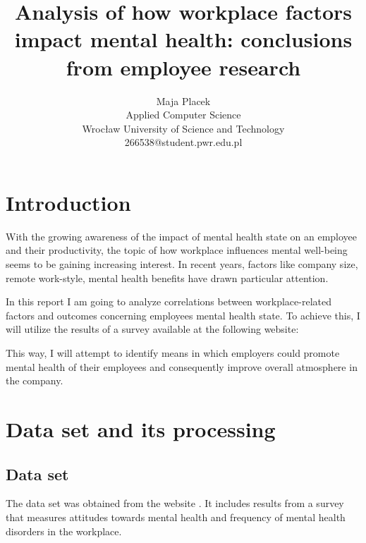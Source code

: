 \documentclass[conference]{IEEEtran}
\title{Analysis of how workplace factors impact mental health: conclusions from employee research}
\author{Maja Placek\\
Applied Computer Science\\
Wrocław University of Science and Technology\\
266538@student.pwr.edu.pl }
\begin{document}
\maketitle

\section{Introduction}
With the growing awareness of the impact of mental health state on an employee and their productivity, the topic of how workplace influences mental well-being seems to be gaining increasing interest. In recent years, factors like company size, remote work-style, mental health benefits have drawn particular attention. 

In this report I am going to analyze correlations between workplace-related factors and outcomes concerning employees mental health state. To achieve this, I will utilize the results of a survey available at the following website: \cite{dataset}

This way, I will attempt to identify means in which employers could promote mental health of their employees and consequently improve overall atmosphere in the company.
\section{Data set and its processing}

\subsection{Data set}
The data set was obtained from the website \cite{dataset}. It includes results from a survey that measures attitudes towards mental health and frequency of mental health disorders in the workplace.\\
\end{document}
